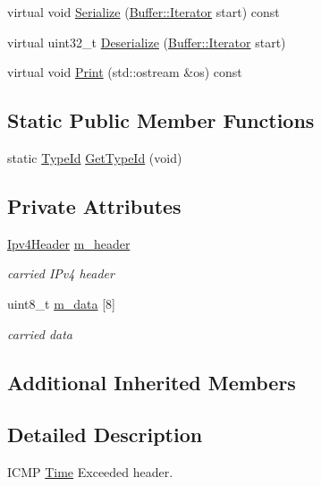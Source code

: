 \begin{DoxyCompactItemize}
\item 
virtual void \hyperlink{classns3_1_1Icmpv4TimeExceeded_a6361230141377b1156792c137ff19c46}{Serialize} (\hyperlink{classns3_1_1Buffer_1_1Iterator}{Buffer\+::\+Iterator} start) const 
\item 
virtual uint32\+\_\+t \hyperlink{classns3_1_1Icmpv4TimeExceeded_a593880fbc22985333cbfb9def08aeca5}{Deserialize} (\hyperlink{classns3_1_1Buffer_1_1Iterator}{Buffer\+::\+Iterator} start)
\item 
virtual void \hyperlink{classns3_1_1Icmpv4TimeExceeded_af95b784543b87ca55859f04167f0dfb8}{Print} (std\+::ostream \&os) const 
\end{DoxyCompactItemize}
\subsection*{Static Public Member Functions}
\begin{DoxyCompactItemize}
\item 
static \hyperlink{classns3_1_1TypeId}{Type\+Id} \hyperlink{classns3_1_1Icmpv4TimeExceeded_a6f958adef29d85683a2e2989ac975aba}{Get\+Type\+Id} (void)
\end{DoxyCompactItemize}
\subsection*{Private Attributes}
\begin{DoxyCompactItemize}
\item 
\hyperlink{classns3_1_1Ipv4Header}{Ipv4\+Header} \hyperlink{classns3_1_1Icmpv4TimeExceeded_a31b8b232ece2371735f0eeaff96227ea}{m\+\_\+header}
\begin{DoxyCompactList}\small\item\em carried I\+Pv4 header \end{DoxyCompactList}\item 
uint8\+\_\+t \hyperlink{classns3_1_1Icmpv4TimeExceeded_aba5d782cc4d349b001a06d09e491fb8e}{m\+\_\+data} \mbox{[}8\mbox{]}
\begin{DoxyCompactList}\small\item\em carried data \end{DoxyCompactList}\end{DoxyCompactItemize}
\subsection*{Additional Inherited Members}


\subsection{Detailed Description}
I\+C\+MP \hyperlink{classns3_1_1Time}{Time} Exceeded header. 

